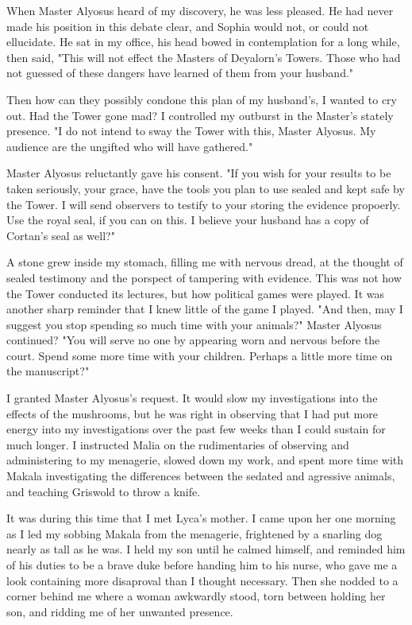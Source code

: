 \documentclass{article}
\begin{document}
When Master Alyosus heard of my discovery, he was less pleased. He had never made his position in this debate clear, and Sophia would not, or could not ellucidate. He sat in my office, his head bowed in contemplation for a long while, then said, "This will not effect the Masters of Deyalorn's Towers. Those who had not guessed of these dangers have learned of them from your husband." 

Then how can they possibly condone this plan of my husband's, I wanted to cry out. Had the Tower gone mad? I controlled my outburst in the Master's stately presence. "I do not intend to sway the Tower with this, Master Alyosus. My audience are the ungifted who will have gathered." 

Master Alyosus reluctantly gave his consent. "If you wish for your results to be taken seriously, your grace, have the tools you plan to use sealed and kept safe by the Tower. I will send observers to testify to your storing the evidence propoerly. Use the royal seal, if you can on this. I believe your husband has a copy of Cortan's seal as well?"

A stone grew inside my stomach, filling me with nervous dread, at the thought of sealed testimony and the porspect of tampering with evidence. This was not how the Tower conducted its lectures, but how political games were played. It was another sharp reminder that I knew little of the game I played.
"And then, may I suggest you stop spending so much time with your animals?" Master Alyosus continued? "You will serve no one by appearing worn and nervous before the court. Spend some more time with your children. Perhaps a little more time on the manuscript?"

I granted Master Alyosus's request. It would slow my investigations into the effects of the mushrooms, but he was right in observing that I had put more energy into my investigations over the past few weeks than I could sustain for much longer. I instructed Malia on the rudimentaries of observing and administering to my menagerie, slowed down my work, and spent more time with Makala investigating the differences between the sedated and agressive animals, and teaching Griswold to throw a knife.

It was during this time that I met Lyca's mother. I came upon her one morning as I led my sobbing Makala from the menagerie, frightened by a snarling dog nearly as tall as he was. I held my son until he calmed himself, and reminded him of his duties to be a brave duke before handing him to his nurse, who gave me a look containing more disaproval than I thought necessary. Then she nodded to a corner behind me where a woman awkwardly stood, torn between holding her son, and ridding me of her unwanted presence.
\end{document}
